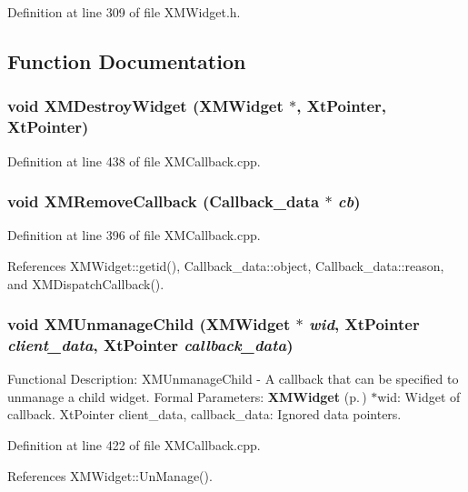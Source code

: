 Definition at line 309 of file XMWidget.h.

\subsection{Function Documentation}
\subsubsection{\setlength{\rightskip}{0pt plus 5cm}void XMDestroy\-Widget ({\bf XMWidget} $\ast$, Xt\-Pointer, Xt\-Pointer)}\label{XMWidget_8h_a3}




Definition at line 438 of file XMCallback.cpp.
\subsubsection{\setlength{\rightskip}{0pt plus 5cm}void XMRemove\-Callback ({\bf Callback\_\-data} $\ast$ {\em cb})}\label{XMWidget_8h_a1}




Definition at line 396 of file XMCallback.cpp.

References XMWidget::getid(), Callback\_\-data::object, Callback\_\-data::reason, and XMDispatch\-Callback().
\subsubsection{\setlength{\rightskip}{0pt plus 5cm}void XMUnmanage\-Child ({\bf XMWidget} $\ast$ {\em wid}, Xt\-Pointer {\em client\_\-data}, Xt\-Pointer {\em callback\_\-data})}\label{XMWidget_8h_a2}


Functional Description: XMUnmanage\-Child - A callback that can be specified to unmanage a child widget. Formal Parameters: {\bf XMWidget} {\rm (p.\,\pageref{classXMWidget})} $\ast$wid: Widget of callback. Xt\-Pointer client\_\-data, callback\_\-data: Ignored data pointers. 

Definition at line 422 of file XMCallback.cpp.

References XMWidget::Un\-Manage().
